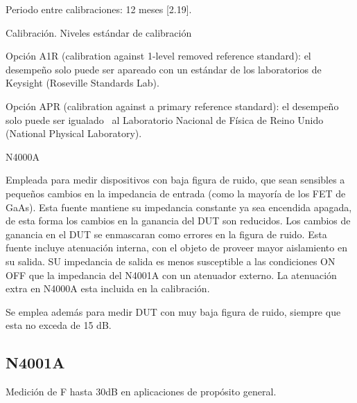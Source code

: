 \documentclass{article}
\begin{document}
Periodo entre calibraciones: 12 meses [2.19].

Calibración. Niveles estándar de calibración

Opción A1R (calibration against 1-level removed reference standard): el desempeño solo puede ser apareado con un estándar de los laboratorios de Keysight (Roseville Standards Lab).

Opción APR (calibration against a primary reference standard): el desempeño solo puede ser igualado \ al Laboratorio Nacional de Física de Reino Unido (National Physical Laboratory).

N4000A \ 

Empleada para medir dispositivos con baja figura de ruido, que sean sensibles a pequeños cambios en la impedancia de entrada (como la mayoría de los FET de GaAs). Esta fuente mantiene su impedancia constante ya sea encendida apagada, de esta forma los cambios en la ganancia del DUT son reducidos. Los cambios de ganancia en el DUT se enmascaran como errores en la figura de ruido. Esta fuente incluye atenuación interna, con el objeto de proveer mayor aislamiento en su salida. SU impedancia de salida es menos susceptible a las condiciones ON OFF que la impedancia del N4001A con un atenuador externo. La atenuación extra en N4000A esta incluida en la calibración.

Se emplea además para medir DUT con muy baja figura de ruido, siempre que esta no exceda de 15 dB.

\subsection[N4001A]{N4001A}
Medición de F hasta 30dB en aplicaciones de propósito general. 
\end{document}

